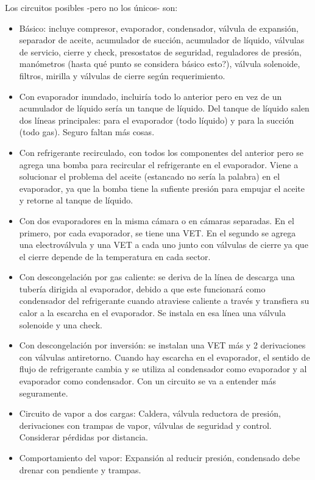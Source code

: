 Los circuitos posibles -pero no los únicos- son:
\begin{itemize}
    \item Básico: incluye compresor, evaporador, condensador, válvula de expansión, separador de aceite, acumulador de succión, acumulador de líquido, válvulas de servicio, cierre y check, presostatos de seguridad, reguladores de presión, manómetros (hasta qué punto se considera básico esto?), válvula solenoide, filtros, mirilla y válvulas de cierre según requerimiento.
    
    \item Con evaporador inundado, incluiría todo lo anterior pero en vez de un acumulador de líquido sería un tanque de líquido. Del tanque de líquido salen dos líneas principales: para el evaporador (todo líquido) y para la succión (todo gas). Seguro faltan más cosas.

    \item Con refrigerante recirculado, con todos los componentes del anterior pero se agrega una bomba para recircular el refrigerante en el evaporador. Viene a solucionar el problema del aceite (estancado no sería la palabra) en el evaporador, ya que la bomba tiene la sufiente presión para empujar el aceite y retorne al tanque de líquido.
    
    \item Con dos evaporadores en la misma cámara o en cámaras separadas. En el primero, por cada evaporador, se tiene una VET. En el segundo se agrega una electroválvula y una VET a cada uno junto con válvulas de cierre ya que el cierre depende de la temperatura en cada sector.
    
    \item Con descongelación por gas caliente: se deriva de la línea de descarga una tubería dirigida al evaporador, debido a que este funcionará como condensador del refrigerante cuando atraviese caliente a través y transfiera su calor a la escarcha en el evaporador. Se instala en esa línea una válvula solenoide y una check.

    \item Con descongelación por inversión: se instalan una VET más y 2 derivaciones con válvulas antiretorno. Cuando hay escarcha en el evaporador, el sentido de flujo de refrigerante cambia y se utiliza al condensador como evaporador y al evaporador como condensador. Con un circuito se va a entender más seguramente.
\end{itemize}

\begin{itemize}
\item Circuito de vapor a dos cargas: Caldera, válvula reductora de presión, derivaciones con trampas de vapor, válvulas de seguridad y control. Considerar pérdidas por distancia.
\item Comportamiento del vapor: Expansión al reducir presión, condensado debe drenar con pendiente y trampas.
\end{itemize}

